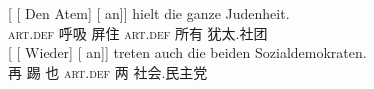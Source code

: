\begin{exe}
\begin{xlist}[iv.]
\begin{exe}
\begin{xlist}[iv.]
\eal
\label{ex-complex-vf}
\ex
\gll {}[ [ Den Atem]  [ an]] hielt die ganze Judenheit.\footnotemark\\
       {}        {}        \textsc{art}.\textsc{def} 呼吸 {}    \partic{}  屏住  \textsc{art}.\textsc{def} 所有 犹太.社团\\
\ex\label{bsp-wieder-an-tritt-zwei}
\gll {}[ [ Wieder] [ an]] treten auch die beiden Sozialdemokraten.\footnotemark\\
      {}         {}        再   {}        \partic{} 踢 也 \textsc{art}.\textsc{def} 两 社会.民主党\\


\end{xlist}
\end{exe}
\end{xlist}
\end{exe}
